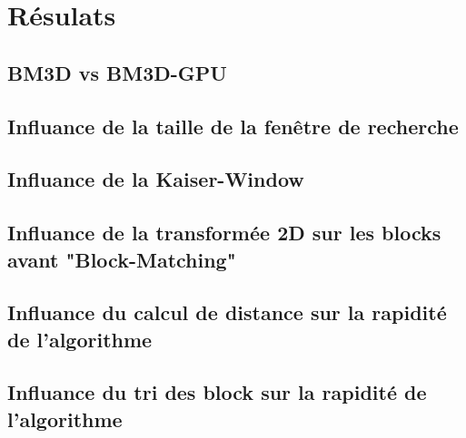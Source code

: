 
\chapter{Résulats}
\section{BM3D vs BM3D-GPU}
\section{Influance de la taille de la fenêtre de recherche}
\section{Influance de la Kaiser-Window}
\section{Influance de la transformée 2D sur les blocks avant "Block-Matching"}
\section{Influance du calcul de distance sur la rapidité de l'algorithme}
\section{Influance du tri des block sur la rapidité de l'algorithme}
